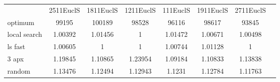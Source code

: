 \begin{tabular}[ht]{|l||c|c|c|c|c|c|H}
 & 2511EuclS & 1811EuclS & 1211EuclS & 111EuclS & 1911EuclS & 2711EuclS & \\  
optimum &99195 & 100189 & 98528 & 96116 & 98617 & 93845 & \\ 
local search &1.00392 & 1.01456 & 1 & 1.01472 & 1.00671 & 1.00498 & \\ 
ls fast &1.00605 & 1 & 1 & 1.00744 & 1.01128 & 1 & \\ 
3 apx &1.19845 & 1.10865 & 1.23954 & 1.09184 & 1.10833 & 1.13838 & \\ 
random &1.13476 & 1.12494 & 1.12943 & 1.1231 & 1.12784 & 1.11763 & \\ 
\end{tabular}